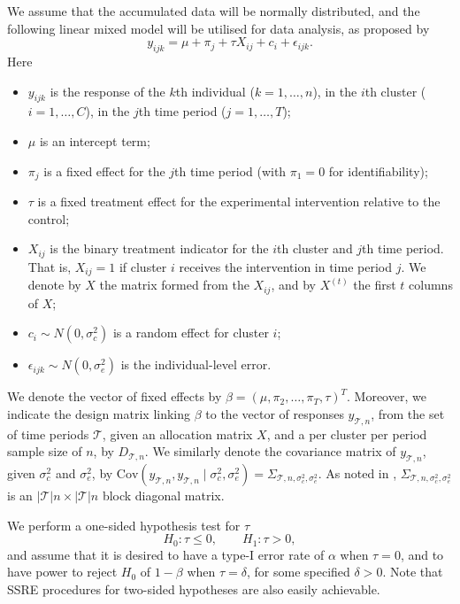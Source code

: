 \documentclass{article}
\begin{document}
We assume that the accumulated data will be normally distributed, and the following linear mixed model will be utilised for data analysis, as proposed by \citet{hussey2007}
\begin{equation}\label{eq2}
y_{ijk} = \mu + \pi_j + \tau X_{ij} + c_i + \epsilon_{ijk}.
\end{equation}
Here
\begin{itemize}
	\item $y_{ijk}$ is the response of the $k$th individual ($k=1,\dots,n$), in the $i$th cluster ($i=1,\dots,C$), in the $j$th time period ($j=1,\dots,T$);
	\item $\mu$ is an intercept term;
	\item $\pi_j$ is a fixed effect for the $j$th time period (with $\pi_1=0$ for identifiability);
	\item $\tau$ is a fixed treatment effect for the experimental intervention relative to the control;
	\item $X_{ij}$ is the binary treatment indicator for the $i$th cluster and $j$th time period. That is, $X_{ij}=1$ if cluster $i$ receives the intervention in time period $j$. We denote by $X$ the matrix formed from the $X_{ij}$, and by $X^{(t)}$ the first $t$ columns of $X$;
	\item $c_{i} \sim N(0,\sigma_c^2)$ is a random effect for cluster $i$;
	\item $\epsilon_{ijk} \sim N(0,\sigma_e^2)$ is the individual-level error.
\end{itemize}
We denote the vector of fixed effects by $\beta=(\mu,\pi_2,\dots,\pi_T,\tau)^T$. Moreover, we indicate the design matrix linking $\beta$ to the vector of responses $y_{\mathscr{T},n}$, from the set of time periods $\mathscr{T}$, given an allocation matrix $X$, and a per cluster per period sample size of $n$, by $D_{\mathscr{T},n}$. We similarly denote the covariance matrix of $y_{\mathscr{T},n}$, given $\sigma_c^2$ and $\sigma_e^2$, by $\text{Cov}(y_{\mathscr{T},n},y_{\mathscr{T},n} \mid\sigma_c^2,\sigma_e^2)=\Sigma_{\mathscr{T},n,\sigma_c^2,\sigma_e^2}$. As noted in \citet{hussey2007}, $\Sigma_{\mathscr{T},n,\sigma_c^2,\sigma_e^2}$ is an $|\mathscr{T}|n\times|\mathscr{T}|n$ block diagonal matrix.

We perform a one-sided hypothesis test for $\tau$
\[ H_0 : \tau \le 0, \qquad H_1 : \tau > 0, \]
and assume that it is desired to have a type-I error rate of $\alpha$ when $\tau=0$, and to have power to reject $H_0$ of $1-\beta$ when $\tau=\delta$, for some specified $\delta>0$. Note that SSRE procedures for two-sided hypotheses are also easily achievable.
\end{document}
